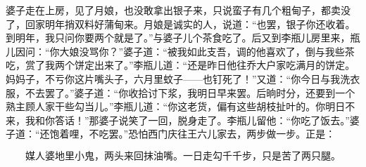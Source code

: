 婆子走在上房，见了月娘，也没敢拿出银子来，只说蛮子有几个粗甸子，都卖没了，回家明年捎双料好蒲甸来。月娘是诚实的人，说道：“也罢，银子你还收着。到明年，我只问你要两个就是了。”与婆子儿个茶食吃了。后又到李瓶儿房里来，瓶儿因问：“你大娘没骂你？”婆子道：“被我如此支吾，调的他喜欢了，倒与我些茶吃，赏了我两个饼定出来了。”李瓶儿道：“还是昨日他往乔大户家吃满月的饼定。妈妈子，不亏你这片嘴头子，六月里蚊子——也钉死了！”又道：“你今日与我洗衣服，不去罢了。”婆子道：“你收拾讨下浆，我明日早来罢。后晌时分，还要到一个熟主顾人家干些勾当儿。”李瓶儿道：“你这老货，偏有这些胡枝扯叶的。你明日不来，我和你答话！”那婆子说笑了一回，脱身走了。李瓶儿留他：“你吃了饭去。”婆子道：“还饱着哩，不吃罢。”恐怕西门庆往王六儿家去，两步做一步。正是：

\[
媒人婆地里小鬼，两头来回抹油嘴。
一日走勾千千步，只是苦了两只腿。
\]
